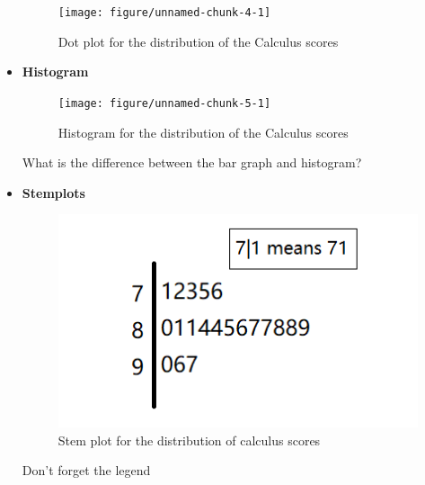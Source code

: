 \documentclass[a4paper, 12pt,twoside]{book}\usepackage[]{graphicx}\usepackage[]{color}
\newenvironment{knitrout}{}{} %
\begin{document}
\begin{itemize}
\begin{knitrout}
\begin{figure}[H]
{\centering \texttt{[image: figure/unnamed-chunk-4-1]} 

}

\caption[\label{dotplot_cal} Dot plot for the distribution of the Calculus scores]{\label{dotplot_cal} Dot plot for the distribution of the Calculus scores}\label{fig:unnamed-chunk-4}
\end{figure}


\end{knitrout}

\item \textbf{Histogram}
\begin{knitrout}
\color{fgcolor}\begin{figure}[H]

{\centering \texttt{[image: figure/unnamed-chunk-5-1]} 

}

\caption[\label{histogram_cal} Histogram for the distribution of the Calculus scores]{\label{histogram_cal} Histogram for the distribution of the Calculus scores}\label{fig:unnamed-chunk-5}
\end{figure}


\end{knitrout}
\colorbox{dollarbill}{What is the difference between the bar graph and histogram?}

\item \textbf{Stemplots}
\begin{figure}[!ht]
\centering
\includegraphics[scale=1]{figure1.png}
\caption{Stem plot for the distribution of calculus scores}
\label{stemplot_cal}
\end{figure}

\colorbox{babypink}{Don't forget the legend}\\
\end{itemize}
\end{document}
